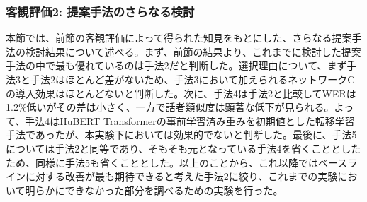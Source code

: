 \documentclass[12pt]{jarticle}
\numberwithin{equation}{section}    %
\numberwithin{figure}{section}      %
\numberwithin{table}{section}      %
\begin{document}
\begin{table}[bt]
    \centering
    \caption{最適なチューニングをした場合における手法ごとの比較}
    \label{sec4:tab:obj_method_comp}
    \begin{center}
        \renewcommand{\arraystretch}{1.0} %
        \setlength{\tabcolsep}{8pt}      %
    \end{center}
\end{table}

\clearpage

\subsubsection{客観評価2: 提案手法のさらなる検討}
本節では、前節の客観評価によって得られた知見をもとにした、さらなる提案手法の検討結果について述べる。まず、前節の結果より、これまでに検討した提案手法の中で最も優れているのは手法2だと判断した。選択理由について、まず手法3と手法2はほとんど差がないため、手法3において加えられるネットワークCの導入効果はほとんどないと判断した。次に、手法4は手法2と比較してWERは1.2\%低いがその差は小さく、一方で話者類似度は顕著な低下が見られる。よって、手法4はHuBERT Transformerの事前学習済み重みを初期値とした転移学習手法であったが、本実験下においては効果的でないと判断した。最後に、手法5については手法2と同等であり、そもそも元となっている手法4を省くこととしたため、同様に手法5も省くこととした。以上のことから、これ以降ではベースラインに対する改善が最も期待できると考えた手法2に絞り、これまでの実験において明らかにできなかった部分を調べるための実験を行った。
\end{document}
